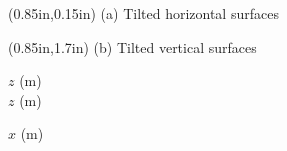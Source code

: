 \documentclass{article}
\begin{document}
\TPMargin{2pt}
\begin{textblock*}{13em}(0.85in,0.15in)
\normalsize
{}
(a) Tilted horizontal surfaces
\end{textblock*}
\begin{textblock*}{12em}(0.85in,1.7in)
\normalsize
{}
(b) Tilted vertical surfaces
\end{textblock*}

$z$ (\si{\meter}) 
\\
$z$ (\si{\meter}) 

\vspace{0.5em}
\hspace*{18em}$x$ (\si{\meter})
\end{document}
